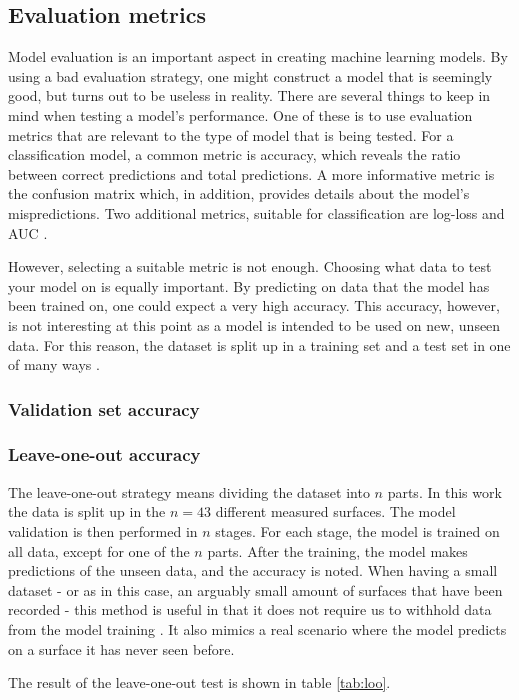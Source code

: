 \subsection{Evaluation metrics}
Model evaluation is an important aspect in creating machine learning models. By using a bad evaluation strategy, one might construct a model that is seemingly good, but turns out to be useless in reality. There are several things to keep in mind when testing a model's performance. One of these is to use evaluation metrics that are relevant to the type of model that is being tested. For a classification model, a common metric is accuracy, which reveals the ratio between correct predictions and total predictions. A more informative metric is the confusion matrix which, in addition, provides details about the model's mispredictions. Two additional metrics, suitable for classification are log-loss and AUC \citep{zheng_2015}. 

However, selecting a suitable metric is not enough. Choosing what data to test your model on is equally important. By predicting on data that the model has been trained on, one could expect a very high accuracy. This accuracy, however, is not interesting at this point as a model is intended to be used on new, unseen data. For this reason, the dataset is split up in a training set and a test set in one of many ways \citep{raschka}.


\subsubsection{Validation set accuracy}



\subsubsection{Leave-one-out accuracy}
The leave-one-out strategy means dividing the dataset into $n$ parts. In this work the data is split up in the $n=43$ different measured surfaces. The model validation is then performed in $n$ stages. For each stage, the model is trained on all data, except for one of the $n$ parts. After the training, the model makes predictions of the unseen data, and the accuracy is noted. When having a small dataset - or as in this case, an arguably small amount of surfaces that have been recorded - this method is useful in that it does not require us to withhold data from the model training \citep{raschka}. It also mimics a real scenario where the model predicts on a surface it has never seen before.

The result of the leave-one-out test is shown in table \ref{tab:loo}.











